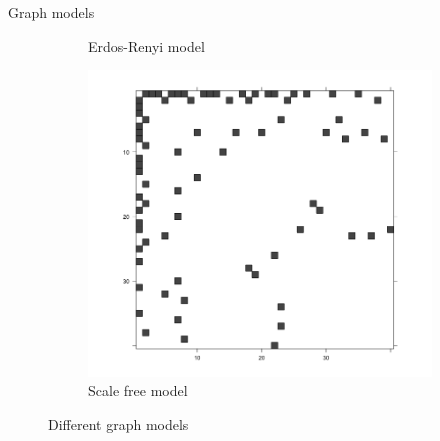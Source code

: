 \documentclass[11pt]{beamer}
\begin{document}
\begin{frame}{Graph models}
\begin{figure}
\begin{subfigure}[b]{0.30\textwidth}
													\caption{Erdos-Renyi model}
												\end{subfigure}
												\begin{subfigure}[b]{0.30\textwidth}
													\includegraphics[width=\textwidth]{images/graph_scale_free.png}
													\caption{Scale free model}
												\end{subfigure}
												\caption{Different graph models}
											\end{figure}
										\end{frame}
										
\end{document}
